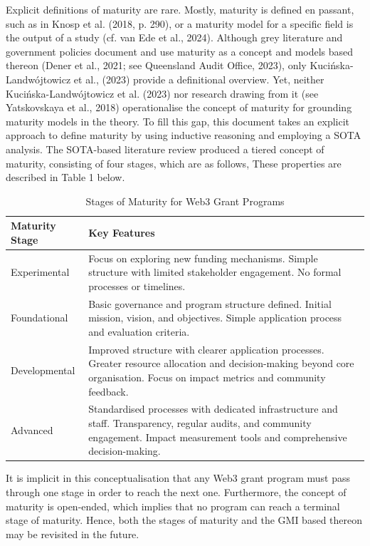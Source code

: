 \documentclass[conference]{IEEEtran}
\begin{document}
Explicit definitions of maturity are rare. Mostly, maturity is defined en passant, such as in Knosp et al. (2018, p. 290), or a maturity model for a specific field is the output of a study (cf. van Ede et al., 2024). Although grey literature and government policies document and use maturity as a concept and models based thereon (Dener et al., 2021; see Queensland Audit Office, 2023), only Kucińska-Landwójtowicz et al., (2023) provide a definitional overview. Yet, neither Kucińska-Landwójtowicz et al. (2023) nor research drawing from it (see Yatskovskaya et al., 2018) operationalise the concept of maturity for grounding maturity models in the theory.  To fill this gap, this document takes an explicit approach to define maturity by using inductive reasoning and employing a SOTA analysis. The SOTA-based literature review produced a tiered concept of maturity, consisting of four stages, which are as follows, These properties are described in Table 1 below.

\begin{table}[htbp]
\caption{Stages of Maturity for Web3 Grant Programs}
\footnotesize
\begin{tabular}{p{2cm}p{6cm}}
\hline
\textbf{Maturity Stage} & \textbf{Key Features} \\
\hline
Experimental & Focus on exploring new funding mechanisms. Simple structure with limited stakeholder engagement. No formal processes or timelines. \\
\hline
Foundational & Basic governance and program structure defined. Initial mission, vision, and objectives. Simple application process and evaluation criteria. \\
\hline
Developmental & Improved structure with clearer application processes. Greater resource allocation and decision-making beyond core organisation. Focus on impact metrics and community feedback. \\
\hline
Advanced & Standardised processes with dedicated infrastructure and staff. Transparency, regular audits, and community engagement. Impact measurement tools and comprehensive decision-making. \\
\hline
\end{tabular}
\label{tab:grant_maturity}
\end{table}

It is implicit in this conceptualisation that any Web3 grant program must pass through one stage in order to reach the next one. Furthermore, the concept of maturity is open-ended, which implies that no program can reach a terminal stage of maturity. Hence, both the stages of maturity and the GMI based thereon may be revisited in the future.
\end{document}
